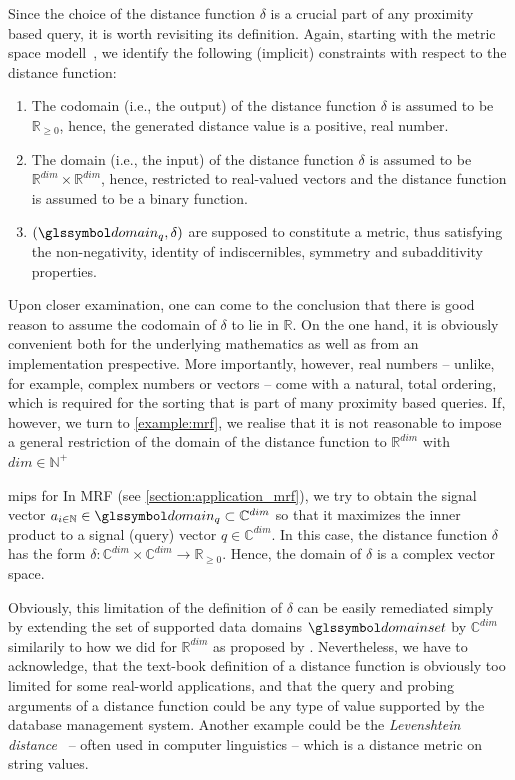 Since the choice of the distance function $\delta$ is a crucial part of any proximity based query, it is worth revisiting its definition. Again, starting with the metric space modell~\cite{Zezula:2006similarity}, we identify the following (implicit) constraints with respect to the distance function:

\begin{enumerate}
    \item The codomain (i.e., the output) of the distance function $\delta$ is assumed to be $\mathbb{R}_{\geq 0}$, hence, the generated distance value is a positive, real number.
    \item The domain (i.e., the input) of the distance function $\delta$ is assumed to be $\mathbb{R}^{dim} \times \mathbb{R}^{dim}$, hence, restricted to real-valued vectors and the distance function is assumed to be a binary function.
    \item $(\domain_q,\delta)$ are supposed to constitute a metric, thus satisfying the non-negativity, identity of indiscernibles, symmetry and subadditivity properties.
\end{enumerate}

Upon closer examination, one can come to the conclusion that there is good reason to assume the codomain of $\delta$ to lie in $\mathbb{R}$. On the one hand, it is obviously convenient both for the underlying mathematics as well as from an implementation prespective. More importantly, however, real numbers -- unlike, for example, complex numbers or vectors -- come with a natural, total ordering, which is required for the sorting that is part of many proximity based queries. If, however, we turn to \cref{example:mrf}, we realise that it is not reasonable to impose a general restriction of the domain of the distance function to $\mathbb{R}^{dim}$ with $dim \in \mathbb{N^{+}}$

\begin{example}[label=example:mrf]{\gls{mips}{} for }{}
    In MRF (see \cref{section:application_mrf}), we try to obtain the signal vector $a_{i \in \mathbb{N}} \in \domain_q \subset \mathbb{C}^{dim}$ so that it maximizes the inner product to a signal (query) vector $q \in \mathbb{C}^{dim}$. In this case, the distance function $\delta$ has the form $\delta \colon \mathbb{C}^{dim} \times \mathbb{C}^{dim} \to \mathbb{R}_{\geq 0}$. Hence, the domain of $\delta$ is a complex vector space.
\end{example}

Obviously, this limitation of the definition of $\delta$ can be easily remediated simply by extending the set of supported data domains $\domainset$ by $\mathbb{C}^{dim}$ similarily to how we did for $\mathbb{R}^{dim}$ as proposed by \cite{Giangreco:2018thesis}. Nevertheless, we have to acknowledge, that the text-book definition of a distance function is obviously too limited for some real-world applications, and that the query and probing arguments of a distance function could be any type of value supported by the database management system. Another example could be the \emph{Levenshtein distance}~\cite{Levensthtein:1965Binary} -- often used in computer linguistics -- which is a distance metric on string values.

